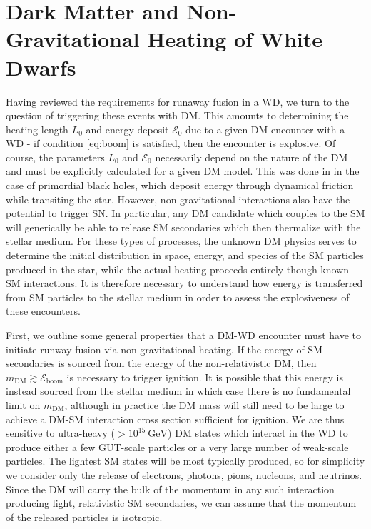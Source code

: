 \documentclass[twocolumn,showpacs,preprintnumbers,amsmath,amssymb,prd]{revtex4}
\newcommand{\Ez}{\mathcal{E}_0}
\newcommand{\Eboom}{\mathcal{E}_\text{boom}}
\newcommand{\GeV}{\text{GeV}}
\begin{document}
\section{Dark Matter and Non-Gravitational Heating of White Dwarfs}
\label{sec:SMHeating}

Having reviewed the requirements for runaway fusion in a WD, we turn to the question of triggering these events with DM. 
This amounts to determining the heating length $L_0$ and energy deposit $\Ez$ due to a given DM encounter with a WD - if condition \eqref{eq:boom} is satisfied, then the encounter is explosive.
Of course, the parameters $L_0$ and $\Ez$ necessarily depend on the nature of the DM and must be explicitly calculated for a given DM model. 
This was done in \cite{Graham:2015apa} in the case of primordial black holes, which deposit energy through dynamical friction while transiting the star.
However, non-gravitational interactions also have the potential to trigger SN. 
In particular, any DM candidate which couples to the SM will generically be able to release SM secondaries which then thermalize with the stellar medium. 
For these types of processes, the unknown DM physics serves to determine the initial distribution in space, energy, and species of the SM particles produced in the star, while the actual heating proceeds entirely though known SM interactions. 
It is therefore necessary to understand how energy is transferred from SM particles to the stellar medium in order to assess the explosiveness of these encounters.

First, we outline some general properties that a DM-WD encounter must have to initiate runway fusion via non-gravitational heating.
If the energy of SM secondaries is sourced from the energy of the non-relativistic DM, then $m_\text{DM} \gtrsim \Eboom$ is necessary to trigger ignition. 
It is possible that this energy is instead sourced from the stellar medium in which case there is no fundamental limit on $m_\text{DM}$, although in practice the DM mass will still need to be large to achieve a DM-SM interaction cross section sufficient for ignition.
We are thus sensitive to ultra-heavy ($>10^{15} ~\GeV$) DM states which interact in the WD to produce either a few GUT-scale particles or a very large number of weak-scale particles. 
The lightest SM states will be most typically produced, so for simplicity we consider only the release of electrons, photons, pions, nucleons, and neutrinos. 
Since the DM will carry the bulk of the momentum in any such interaction producing light, relativistic SM secondaries, we can assume that the momentum of the released particles is isotropic. 
\end{document}
